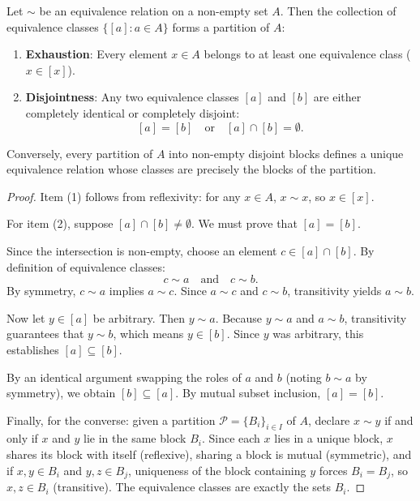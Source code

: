 \begin{theorem}
Let $\sim$ be an equivalence relation on a non-empty set $A$. Then the collection of equivalence classes $\{[a] : a \in A\}$ forms a partition of $A$:
\begin{enumerate}
  \item \textbf{Exhaustion}: Every element $x \in A$ belongs to at least one equivalence class ($x \in [x]$).
  \item \textbf{Disjointness}: Any two equivalence classes $[a]$ and $[b]$ are either completely identical or completely disjoint:
  \[
  [a] = [b] \quad \text{or} \quad [a] \cap [b] = \emptyset.
  \]
\end{enumerate}
Conversely, every partition of $A$ into non-empty disjoint blocks defines a unique equivalence relation whose classes are precisely the blocks of the partition.
\end{theorem}

\begin{proof}
Item (1) follows from reflexivity: for any $x \in A$, $x \sim x$, so $x \in [x]$.

For item (2), suppose $[a] \cap [b] \neq \emptyset$. We must prove that $[a] = [b]$.

Since the intersection is non-empty, choose an element $c \in [a] \cap [b]$. By definition of equivalence classes:
\[
c \sim a \quad \text{and} \quad c \sim b.
\]
By symmetry, $c \sim a$ implies $a \sim c$. Since $a \sim c$ and $c \sim b$, transitivity yields $a \sim b$.

Now let $y \in [a]$ be arbitrary. Then $y \sim a$. Because $y \sim a$ and $a \sim b$, transitivity guarantees that $y \sim b$, which means $y \in [b]$. Since $y$ was arbitrary, this establishes $[a] \subseteq [b]$.

By an identical argument swapping the roles of $a$ and $b$ (noting $b \sim a$ by symmetry), we obtain $[b] \subseteq [a]$. By mutual subset inclusion, $[a] = [b]$.

Finally, for the converse: given a partition $\mathcal{P} = \{B_i\}_{i \in I}$ of $A$, declare $x \sim y$ if and only if $x$ and $y$ lie in the same block $B_i$. Since each $x$ lies in a unique block, $x$ shares its block with itself (reflexive), sharing a block is mutual (symmetric), and if $x, y \in B_i$ and $y, z \in B_j$, uniqueness of the block containing $y$ forces $B_i = B_j$, so $x, z \in B_i$ (transitive). The equivalence classes are exactly the sets $B_i$.
\end{proof}

